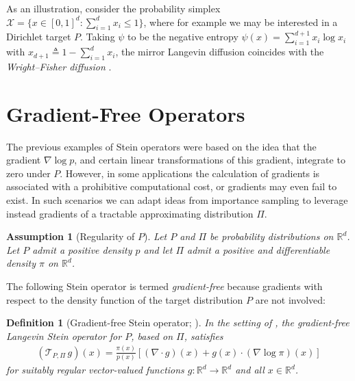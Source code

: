 \documentclass[12pt,paper=letter]{scrreprt}
\newtheorem{definition}{Definition}[chapter]
\def\reals{\mathbb{R}} %
\def\defeq{\triangleq} %
\newtheorem{assumption}{Assumption}[chapter]
\newcommand{\xset}[0]{\mathcal{X}} %
\begin{document}
As an illustration, consider the probability simplex $\xset = \{x \in [0,1]^d : \sum_{i=1}^d x_i \leq 1\}$, where for example we may be interested in a Dirichlet target $P$.
Taking $\psi$ to be the negative entropy $\psi(x) = \sum_{i=1}^{d+1} x_i \log x_i$ with $x_{d+1} \defeq  1 - \sum_{i=1}^d x_i$, the mirror Langevin diffusion coincides with the \emph{Wright--Fisher diffusion} \citep{ethier1976class}.







\section{Gradient-Free Operators}
\label{sec: grad free operators}



The previous examples of Stein operators were based on the idea that the gradient $\nabla \log p$, and certain linear transformations of this gradient, integrate to zero under $P$.
However, in some applications the calculation of gradients is associated with a prohibitive computational cost, or gradients may even fail to exist.
In such scenarios we can adapt ideas from importance sampling to leverage instead gradients of a tractable approximating distribution $\Pi$.

\begin{assumption}[Regularity of $P$]
\label{ass: reg grad free}
    Let $P$ and $\Pi$ be probability distributions on $\reals^d$.
    Let $P$ admit a positive density $p$ and let $\Pi$ admit a positive and differentiable density $\pi$ on $\reals^d$.
\end{assumption}

The following Stein operator is termed \emph{gradient-free} because gradients with respect to the density function of the target distribution $P$ are not involved:

\begin{definition}[Gradient-free Stein operator; \citealp{han2018stein}]
\label{def: gf stein op}
    In the setting of , the \emph{gradient-free Langevin Stein operator} for $P$, based on $\Pi$, satisfies
    \begin{align}
        (\mathcal{T}_{P,\Pi} \, g)(x) = \frac{\pi(x)}{p(x)} \left[ (\nabla \cdot g)(x) + g(x) \cdot (\nabla \log \pi)(x) \right] \label{eq: gf op}
    \end{align}
    for suitably regular vector-valued functions $g : \reals^d \rightarrow \reals^d$ and all $x \in \reals^d$.
\end{definition}
\end{document}
